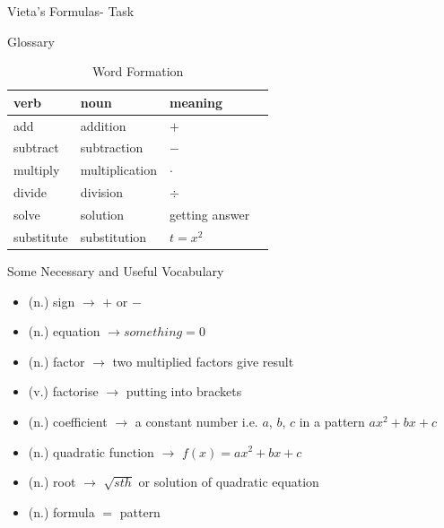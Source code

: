 \documentclass[final]{beamer}
\newlength{\onecolwid}
\begin{document}
\begin{frame}[t]
\begin{columns}[t]
\begin{column}{\onecolwid}
\begin{block}{Vieta's Formulas- Task}
\end{block}




\begin{block}{Glossary}

\begin{table}
\vspace{2ex}
\begin{tabular}{l l l l}
\toprule
\textbf{verb} & \textbf{noun} & \textbf{meaning}\\
\midrule
add & addition & $+$ \\
subtract & subtraction & $-$ \\
multiply & multiplication & $\cdot$ \\
divide & division & $\div$ \\
solve & solution & getting answer \\
substitute & substitution & $t=x^2$ \\



\bottomrule
\end{tabular}
\caption{Word Formation}
\end{table}


\end{block}


\begin{alertblock}{Some Necessary and Useful Vocabulary}

\begin{itemize}
\item (n.) sign $\rightarrow$ $+$ or $-$
\item (n.) equation $\rightarrow something = 0$ 
\item (n.) factor $\rightarrow$ two multiplied factors give result
\item (v.) factorise $\rightarrow$ putting into brackets
\item (n.) coefficient $\rightarrow$ a constant number i.e. $a$, $b$, $c$ in a pattern $ax^2+bx+c$
\item (n.) quadratic function $\rightarrow$ $f(x) = ax^2+bx+c$
\item (n.) root $\rightarrow$ $\sqrt{sth}$ or solution of quadratic equation
\item (n.) formula $=$ pattern
\end{itemize}


\end{alertblock}
\end{column}
\end{columns}
\end{frame}
\end{document}
